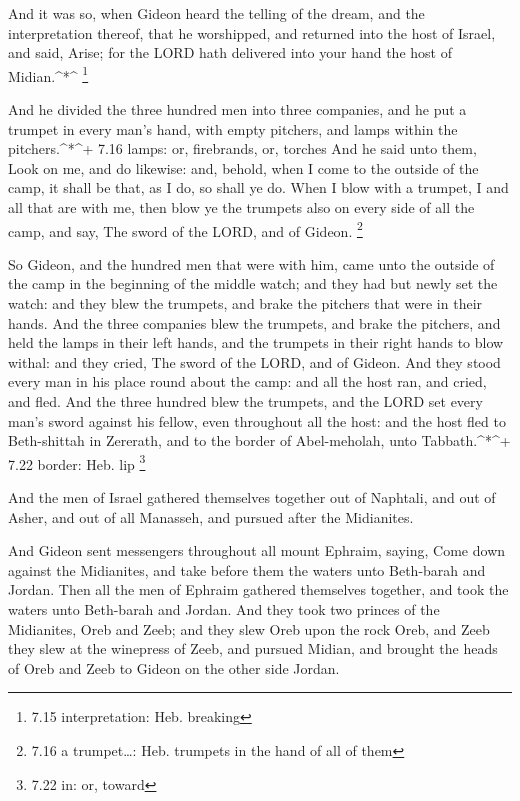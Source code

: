  And it was so, when Gideon heard the telling of the dream,
and the interpretation thereof, that he worshipped, and returned into
the host of Israel, and said, Arise; for the LORD hath delivered into
your hand the host of Midian.\^{}*\^{} \footnote{7.15 interpretation:
  Heb. breaking}

 And he divided the three hundred men into three companies,
and he put a trumpet in every man's hand, with empty pitchers, and lamps
within the pitchers.\^{}*\^{}+ 7.16 lamps: or, firebrands, or, torches
 And he said unto them, Look on me, and do likewise: and,
behold, when I come to the outside of the camp, it shall be that, as I
do, so shall ye do.  When I blow with a trumpet, I and all
that are with me, then blow ye the trumpets also on every side of all
the camp, and say, The sword of the LORD, and of Gideon. \footnote{7.16
  a trumpet\ldots: Heb. trumpets in the hand of all of them}

 So Gideon, and the hundred men that were with him, came
unto the outside of the camp in the beginning of the middle watch; and
they had but newly set the watch: and they blew the trumpets, and brake
the pitchers that were in their hands.  And the three
companies blew the trumpets, and brake the pitchers, and held the lamps
in their left hands, and the trumpets in their right hands to blow
withal: and they cried, The sword of the LORD, and of Gideon.
 And they stood every man in his place round about the
camp: and all the host ran, and cried, and fled.  And the
three hundred blew the trumpets, and the LORD set every man's sword
against his fellow, even throughout all the host: and the host fled to
Beth-shittah in Zererath, and to the border of Abel-meholah, unto
Tabbath.\^{}*\^{}+ 7.22 border: Heb. lip \footnote{7.22 in: or, toward}

 And the men of Israel gathered themselves together out of
Naphtali, and out of Asher, and out of all Manasseh, and pursued after
the Midianites.

 And Gideon sent messengers throughout all mount Ephraim,
saying, Come down against the Midianites, and take before them the
waters unto Beth-barah and Jordan. Then all the men of Ephraim gathered
themselves together, and took the waters unto Beth-barah and Jordan.
 And they took two princes of the Midianites, Oreb and
Zeeb; and they slew Oreb upon the rock Oreb, and Zeeb they slew at the
winepress of Zeeb, and pursued Midian, and brought the heads of Oreb and
Zeeb to Gideon on the other side Jordan.

